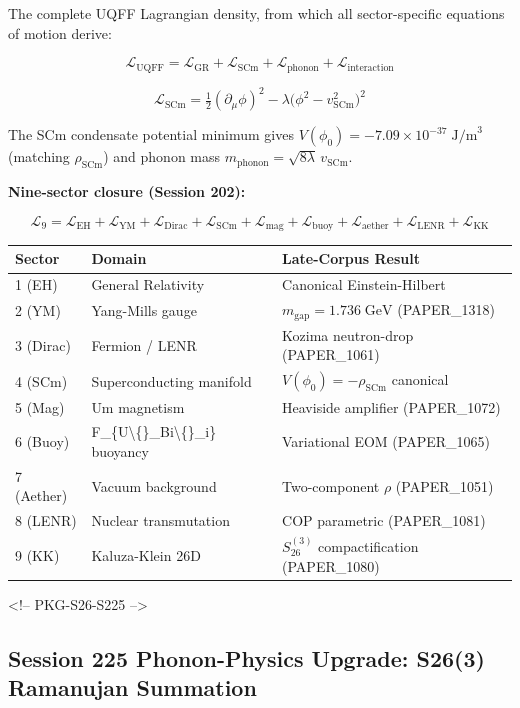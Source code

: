 \documentclass[11pt]{article}
\begin{document}
The complete UQFF Lagrangian density, from which all sector-specific equations of motion derive:

$$\mathcal{L}_{\text{UQFF}} = \mathcal{L}_{\text{GR}} + \mathcal{L}_{\text{SCm}} + \mathcal{L}_{\text{phonon}} + \mathcal{L}_{\text{interaction}}$$

$$\mathcal{L}_{\text{SCm}} = \tfrac{1}{2}(\partial_\mu \phi)^2 - \lambda\bigl(\phi^2 - v_{\text{SCm}}^2\bigr)^2$$

The SCm condensate potential minimum gives $V(\phi_0) = -7.09 \times 10^{-37}\;\text{J/m}^3$ (matching $\rho_{\text{SCm}}$) and phonon mass $m_{\text{phonon}} = \sqrt{8\lambda}\,v_{\text{SCm}}$.

\textbf{Nine-sector closure (Session 202):}

$$\mathcal{L}_{9} = \mathcal{L}_{\text{EH}} + \mathcal{L}_{\text{YM}} + \mathcal{L}_{\text{Dirac}} + \mathcal{L}_{\text{SCm}} + \mathcal{L}_{\text{mag}} + \mathcal{L}_{\text{buoy}} + \mathcal{L}_{\text{aether}} + \mathcal{L}_{\text{LENR}} + \mathcal{L}_{\text{KK}}$$

\begin{center}
\begin{longtable}{lll}
\toprule
Sector & Domain & Late-Corpus Result \tabularnewline
\midrule
\endhead
1 (EH) & General Relativity & Canonical Einstein-Hilbert \tabularnewline
2 (YM) & Yang-Mills gauge & $m_{\text{gap}} = 1.736\;\text{GeV}$ (PAPER\_1318) \tabularnewline
3 (Dirac) & Fermion / LENR & Kozima neutron-drop (PAPER\_1061) \tabularnewline
4 (SCm) & Superconducting manifold & $V(\phi_0) = -\rho_{\text{SCm}}$ canonical \tabularnewline
5 (Mag) & Um magnetism & Heaviside amplifier (PAPER\_1072) \tabularnewline
6 (Buoy) & F\_\{U\textbackslash\{\}\_Bi\textbackslash\{\}\_i\} buoyancy & Variational EOM (PAPER\_1065) \tabularnewline
7 (Aether) & Vacuum background & Two-component $\rho$ (PAPER\_1051) \tabularnewline
8 (LENR) & Nuclear transmutation & COP parametric (PAPER\_1081) \tabularnewline
9 (KK) & Kaluza-Klein 26D & $S_{26}^{(3)}$ compactification (PAPER\_1080) \tabularnewline
\bottomrule
\end{longtable}
\end{center}

<!-- PKG-S26-S225 -->

\subsection*{Session 225 Phonon-Physics Upgrade: S26(3) Ramanujan Summation}
\end{document}
